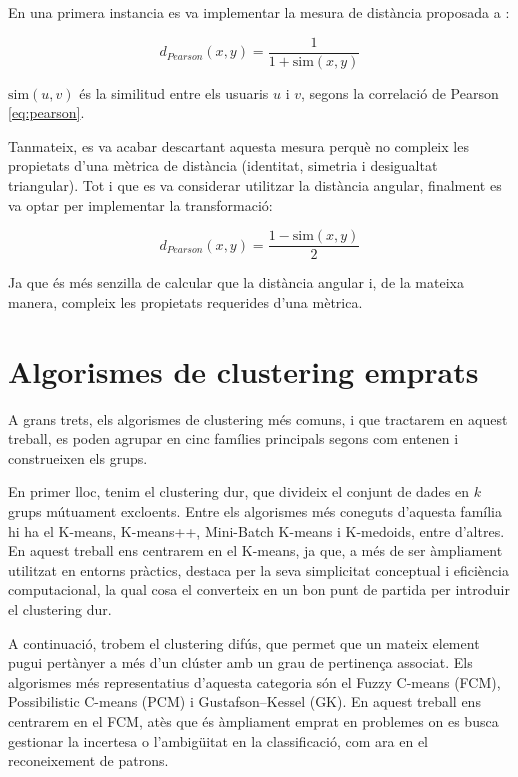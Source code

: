 \documentclass[a4paper,12pt]{report}
\begin{document}
En una primera instancia es va implementar la mesura de distància proposada a \cite{zahra2015novel}:

\[
d_{Pearson}(x,y) = \frac{1}{1 + \text{sim}(x,y)}
\]

\( \text{sim}(u,v) \) és la similitud entre els usuaris \( u \) i \( v \), segons la correlació de Pearson \ref{eq:pearson}. 

Tanmateix, es va acabar descartant aquesta mesura perquè no compleix les propietats d’una mètrica de distància (identitat, simetria i desigualtat triangular).
Tot i que es va considerar utilitzar la distància angular, finalment es va optar per implementar la transformació:

\[
d_{Pearson}(x,y) = \frac{1 - \text{sim}(x,y)}{2}
\]

Ja que és més senzilla de calcular que la distància angular i, de la mateixa manera, compleix les propietats requerides d’una mètrica.

\vspace{0.5cm}
\section{Algorismes de clustering emprats}

A grans trets, els algorismes de clustering més comuns, i que tractarem en aquest treball, es poden agrupar en cinc famílies principals segons com entenen i construeixen els grups. \cite{ezugwu2022comprehensive}

En primer lloc, tenim el clustering dur, que divideix el conjunt de dades en $k$ grups mútuament excloents. Entre els algorismes més coneguts d’aquesta família hi ha el K-means, K-means++, Mini-Batch K-means i K-medoids, entre d'altres. En aquest treball ens centrarem en el K-means, ja que, a més de ser àmpliament utilitzat en entorns pràctics, destaca per la seva simplicitat conceptual i eficiència computacional, la qual cosa el converteix en un bon punt de partida per introduir el clustering dur.

A continuació, trobem el clustering difús, que permet que un mateix element pugui pertànyer a més d’un clúster amb un grau de pertinença associat. Els algorismes més representatius d’aquesta categoria són el Fuzzy C-means (FCM), Possibilistic C-means (PCM) i Gustafson–Kessel (GK). En aquest treball ens centrarem en el FCM, atès que és àmpliament emprat en problemes on es busca gestionar la incertesa o l’ambigüitat en la classificació, com ara en el reconeixement de patrons.
\end{document}
